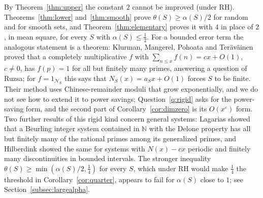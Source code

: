 \documentclass[11pt]{amsart}
\theoremstyle{remark}
\numberwithin{equation}{section}
\newcommand{\N}{\mathbb{N}}
\newcommand{\cN}{\mathcal{N}}
\newcommand{\eps}{\varepsilon}
\begin{document}
By Theorem~\ref{thm:upper} the constant $2$ cannot be improved (under RH). Theorems~\ref{thm:lower} and~\ref{thm:smooth} prove $\theta(S)\ge\alpha(S)/2$ for random and for smooth sets, and Theorem~\ref{thm:elementary} proves it with $4$ in place of $2$, in mean square, for every $S$ with $\alpha(S)\le\tfrac12$. For a bounded error term the analogous statement is a theorem: Klurman, Mangerel, Pohoata and Ter\"av\"ainen \cite{KMPT} proved that a completely multiplicative $f$ with $\sum_{n\le x}f(n)=cx+O(1)$, $c\ne0$, has $f(p)=1$ for all but finitely many primes, answering a question of Ruzsa; for $f=1_{\cN_S}$ this says that $N_S(x)=a_Sx+O(1)$ forces $S$ to be finite. Their method uses Chinese-remainder moduli that grow exponentially, and we do not see how to extend it to power savings; Question~\ref{q:rigid} asks for the power-saving form, and the second part of Corollary~\ref{cor:dimzero} is its $O(x^{\eps})$ form. Two further results of this rigid kind concern general systems: Lagarias \cite{Lagarias} showed that a Beurling integer system contained in $\N$ with the Delone property has all but finitely many of the rational primes among its generalized primes, and Hilberdink \cite{H12} showed the same for systems with $N(x)-cx$ periodic and finitely many discontinuities in bounded intervals. The stronger inequality $\theta(S)\ge\min(\alpha(S)/2,\tfrac14)$ for every $S$, which under RH would make $\tfrac14$ the threshold in Corollary~\ref{cor:quarter}, appears to fail for $\alpha(S)$ close to $1$; see Section~\ref{subsec:largealpha}.
\end{document}
